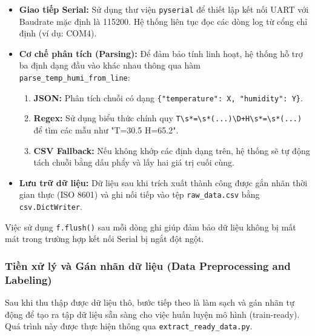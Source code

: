 \begin{itemize}
    \item \textbf{Giao tiếp Serial:} Sử dụng thư viện \texttt{pyserial} để thiết lập kết nối UART với Baudrate mặc định là 115200. Hệ thống liên tục đọc các dòng log từ cổng chỉ định (ví dụ: COM4).
    \item \textbf{Cơ chế phân tích (Parsing):} Để đảm bảo tính linh hoạt, hệ thống hỗ trợ ba định dạng đầu vào khác nhau thông qua hàm \texttt{parse\_temp\_humi\_from\_line}:
    \begin{enumerate}
        \item \textbf{JSON:} Phân tích chuỗi có dạng \texttt{\{"temperature": X, "humidity": Y\}}.
        \item \textbf{Regex:} Sử dụng biểu thức chính quy \texttt{T\textbackslash s*=\textbackslash s*(...)\textbackslash D+H\textbackslash s*=\textbackslash s*(...)} để tìm các mẫu như "T=30.5 H=65.2".
        \item \textbf{CSV Fallback:} Nếu không khớp các định dạng trên, hệ thống sẽ tự động tách chuỗi bằng dấu phẩy và lấy hai giá trị cuối cùng.
    \end{enumerate}
    \item \textbf{Lưu trữ dữ liệu:} Dữ liệu sau khi trích xuất thành công được gắn nhãn thời gian thực (ISO 8601) và ghi nối tiếp vào tệp \texttt{raw\_data.csv} bằng \texttt{csv.DictWriter}.
\end{itemize}

Việc sử dụng \texttt{f.flush()} sau mỗi dòng ghi giúp đảm bảo dữ liệu không bị mất mát trong trường hợp kết nối Serial bị ngắt đột ngột.
\newpage
\subsubsection{Tiền xử lý và Gán nhãn dữ liệu (Data Preprocessing and Labeling)}

Sau khi thu thập được dữ liệu thô, bước tiếp theo là làm sạch và gán nhãn tự động để tạo ra tập dữ liệu sẵn sàng cho việc huấn luyện mô hình (train-ready). Quá trình này được thực hiện thông qua  \texttt{extract\_ready\_data.py}.

